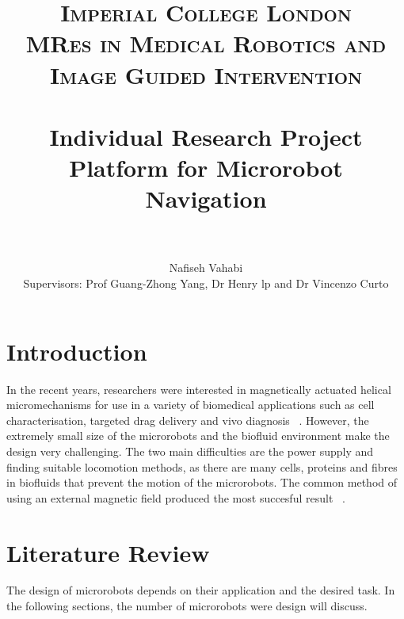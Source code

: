 \documentclass[a4paper,11pt]{article}
\title{
\normalfont \normalsize
\textsc{Imperial College London\\
MRes in Medical Robotics and Image Guided Intervention} \\ [1pt] %
\horrule{0.5pt} \\[0.4cm] %
\huge Individual Research Project \\
Platform for Microrobot Navigation \\ %
\horrule{2pt} \\[0.1cm] %
}
\author{
        Nafiseh Vahabi\\
	Supervisors: Prof Guang-Zhong Yang, Dr Henry lp and Dr Vincenzo Curto
}
\begin{document}



\begin{sloppypar}


\maketitle
\thispagestyle{plain}


\section{Introduction}

In the recent years, researchers were interested in magnetically actuated helical micromechanisms for use
 in a variety of biomedical applications such as cell characterisation, targeted drag delivery and vivo 
diagnosis ~\citep{peyer2013magnetic}. However, the extremely small size of the microrobots and the biofluid environment make the design 
very challenging. The two main difficulties are the power supply and finding suitable locomotion methods, as
 there are many cells, proteins and fibres in biofluids that prevent the motion of the microrobots. 
The common method of using an external magnetic field produced the most succesful result ~\citep{peyer2013bio}. 
\paragraph{}



\section{Literature Review}

The design of microrobots depends on their application and the desired task. In the following sections, the number of
microrobots were design will discuss.

\paragraph{}

\end{sloppypar}
\end{document}
